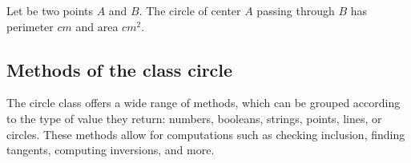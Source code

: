 Let be two points $A$ and $B$. 
The circle of center $A$ passing through $B$ has perimeter  $cm$ and area $cm^2$.


\newpage
\subsection{Methods of the class circle} %
\label{sub:methods_of_the_class_circle}

The circle class offers a wide range of methods, which can be grouped according to the type of value they return: numbers, booleans, strings, points, lines, or circles. These methods allow for computations such as checking inclusion, finding tangents, computing inversions, and more.

